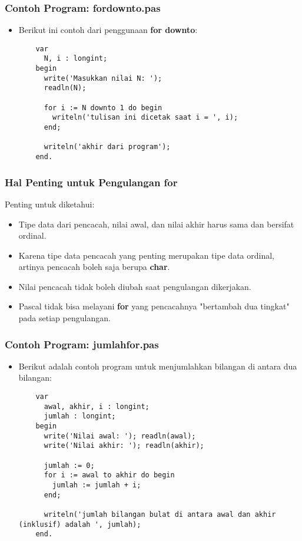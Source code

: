 \begin{frame}[fragile]
\frametitle{Contoh Program: fordownto.pas}
\begin{itemize}
  \item Berikut ini contoh dari penggunaan \textbf{for downto}:
  \begin{lstlisting}
    var
      N, i : longint;
    begin
      write('Masukkan nilai N: ');
      readln(N);

      for i := N downto 1 do begin
        writeln('tulisan ini dicetak saat i = ', i);
      end;

      writeln('akhir dari program');
    end.
  \end{lstlisting}
\end{itemize}
\end{frame}

\begin{frame}
\frametitle{Hal Penting untuk Pengulangan for}
Penting untuk diketahui:
\begin{itemize}
  \item Tipe data dari pencacah, nilai awal, dan nilai akhir harus sama dan bersifat \alert{ordinal}.
  \item Karena tipe data pencacah yang penting merupakan tipe data ordinal, artinya pencacah boleh saja berupa \textbf{char}.
  \item Nilai pencacah tidak boleh diubah saat pengulangan dikerjakan.
  \item Pascal tidak bisa melayani \textbf{for} yang pencacahnya "bertambah dua tingkat" pada setiap pengulangan.
\end{itemize}
\end{frame}

\begin{frame}[fragile]
\frametitle{Contoh Program: jumlahfor.pas}
\begin{itemize}
  \item Berikut adalah contoh program untuk menjumlahkan bilangan di antara dua bilangan:
  \begin{lstlisting}
    var
      awal, akhir, i : longint;
      jumlah : longint;
    begin
      write('Nilai awal: '); readln(awal);
      write('Nilai akhir: '); readln(akhir);

      jumlah := 0;
      for i := awal to akhir do begin
        jumlah := jumlah + i;
      end;

      writeln('jumlah bilangan bulat di antara awal dan akhir (inklusif) adalah ', jumlah);
    end.
  \end{lstlisting}
\end{itemize}
\end{frame}


